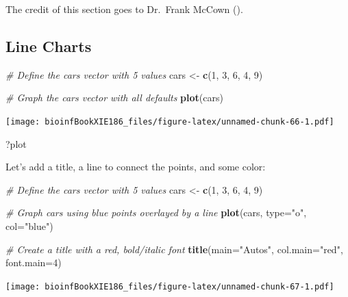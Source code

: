 \documentclass[]{book}
\makeatletter
\newenvironment{Shaded}{\begin{snugshade}}{\end{snugshade}}
\newcommand{\KeywordTok}[1]{\textcolor[rgb]{0.13,0.29,0.53}{\textbf{#1}}}
\newcommand{\DataTypeTok}[1]{\textcolor[rgb]{0.13,0.29,0.53}{#1}}
\newcommand{\DecValTok}[1]{\textcolor[rgb]{0.00,0.00,0.81}{#1}}
\newcommand{\StringTok}[1]{\textcolor[rgb]{0.31,0.60,0.02}{#1}}
\newcommand{\CommentTok}[1]{\textcolor[rgb]{0.56,0.35,0.01}{\textit{#1}}}
\newcommand{\NormalTok}[1]{#1}
\newenvironment{kframe}{%
\medskip{}
\setlength{\fboxsep}{.8em}
 \def\at@end@of@kframe{}%
 \ifinner\ifhmode%
  \def\at@end@of@kframe{\end{minipage}}%
  \begin{minipage}{\columnwidth}%
 \fi\fi%
 \def\FrameCommand##1{\hskip\@totalleftmargin \hskip-\fboxsep
 \colorbox{shadecolor}{##1}\hskip-\fboxsep
     \hskip-\linewidth \hskip-\@totalleftmargin \hskip\columnwidth}%
 \MakeFramed {\advance\hsize-\width
   \@totalleftmargin\z@ \linewidth\hsize
   \@setminipage}}%
 {\par\unskip\endMakeFramed%
 \at@end@of@kframe}
\renewenvironment{Shaded}{\begin{kframe}}{\end{kframe}}
\theoremstyle{definition}
\theoremstyle{definition}
\theoremstyle{definition}
\theoremstyle{remark}
\makeatother
\begin{document}
The credit of this section goes to Dr.~Frank McCown
(\citet{simpleGraphR}).

\subsection{Line Charts}\label{line-charts-1}

\begin{Shaded}
\begin{Highlighting}[]
\CommentTok{# Define the cars vector with 5 values}
\NormalTok{cars <-}\StringTok{ }\KeywordTok{c}\NormalTok{(}\DecValTok{1}\NormalTok{, }\DecValTok{3}\NormalTok{, }\DecValTok{6}\NormalTok{, }\DecValTok{4}\NormalTok{, }\DecValTok{9}\NormalTok{)}

\CommentTok{# Graph the cars vector with all defaults}
\KeywordTok{plot}\NormalTok{(cars)}
\end{Highlighting}
\end{Shaded}

\texttt{[image: bioinfBookXIE186\_files/figure-latex/unnamed-chunk-66-1.pdf]}

\begin{Shaded}
\begin{Highlighting}[]
\NormalTok{?plot}
\end{Highlighting}
\end{Shaded}

Let's add a title, a line to connect the points, and some color:

\begin{Shaded}
\begin{Highlighting}[]
\CommentTok{# Define the cars vector with 5 values}
\NormalTok{cars <-}\StringTok{ }\KeywordTok{c}\NormalTok{(}\DecValTok{1}\NormalTok{, }\DecValTok{3}\NormalTok{, }\DecValTok{6}\NormalTok{, }\DecValTok{4}\NormalTok{, }\DecValTok{9}\NormalTok{)}

\CommentTok{# Graph cars using blue points overlayed by a line }
\KeywordTok{plot}\NormalTok{(cars, }\DataTypeTok{type=}\StringTok{"o"}\NormalTok{, }\DataTypeTok{col=}\StringTok{"blue"}\NormalTok{)}

\CommentTok{# Create a title with a red, bold/italic font}
\KeywordTok{title}\NormalTok{(}\DataTypeTok{main=}\StringTok{"Autos"}\NormalTok{, }\DataTypeTok{col.main=}\StringTok{"red"}\NormalTok{, }\DataTypeTok{font.main=}\DecValTok{4}\NormalTok{)}
\end{Highlighting}
\end{Shaded}

\texttt{[image: bioinfBookXIE186\_files/figure-latex/unnamed-chunk-67-1.pdf]}
\end{document}
